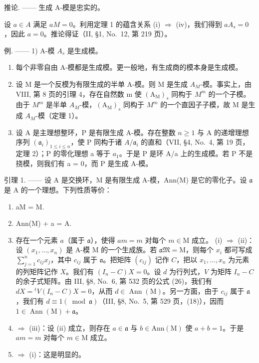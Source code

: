 推论. —— 生成 A-模是忠实的。

设 \(a \in A\) 满足 \(aM = 0\)。利用定理 1 的蕴含关系 (i) \(\Rightarrow\) (iv)，我们得到 \(aA_s = 0\)，因此 \(a = 0\)。推论得证（II, §1, No.~12, 第 219 页）。

例. —— 1) A-模 \(A_s\) 是生成模。

\begin{enumerate}
\def\labelenumi{\arabic{enumi})}
\setcounter{enumi}{1}
\item
  每个非零自由 A-模都是生成模。更一般地，有生成商的模本身是生成模。
\item
  设 M 是一个反模为有限生成的半单 A-模。则 M 是生成 \(A_{M}\)-模。事实上，由 VIII, 第 8 页的引理 4，存在自然数 m 使 \((\mathrm{A}_{\mathrm{M}})_{s}\) 同构于 \(M^{m}\) 的一个子模。由于 \(M^{m}\) 是半单 \(A_{M}\)-模，\((\mathrm{A}_{\mathrm{M}})_{s}\) 同构于 \(M^{m}\) 的一个直因子子模，故 M 是生成 \(A_{M}\)-模（定理 1）。
\item
  设 A 是主理想整环，P 是有限生成 A-模。存在整数 \(n \geqslant 1\) 与 A 的递增理想序列 \((\mathfrak{a}_{i})_{1 \leqslant i \leqslant n}\)，使 P 同构于诸 \(A/\mathfrak{a}_{i}\) 的直和（VII, §4, No.~4, 第 19 页，定理 2）；P 的零化理想 a 等于 \(a_{1}\)。于是 P 是环 A/a 上的生成模。若 P 不是挠模，则我们有 a = 0，而 P 是生成 A-模。
\end{enumerate}

引理 1. —— 设 A 是交换环，M 是有限生成 A-模，Ann(M) 是它的零化子。设 \(\mathfrak{a}\) 是 A 的一个理想。下列性质等价：

\begin{enumerate}
\def\labelenumi{(\roman{enumi})}
\item
  aM = M.
\item
  Ann(M) + a = A.
\item
  存在一个元素 \(a\)（属于 \(\mathfrak{a}\)），使得 \(am = m\) 对每个 \(m \in \mathrm{M}\) 成立。 (i) \(\Rightarrow\) (ii)：设 \((x_1, \ldots, x_n)\) 是 A-模 M 的一个生成族。若 \(\mathfrak{aM} = \mathrm{M}\)，则每个 \(x_i\) 都可写成 \(\sum_{j=1}^{n} c_{ij} x_j\)，其中 \(c_{ij}\) 属于 \(\mathfrak{a}\)。把矩阵 \((c_{ij})\) 记作 \(C\)，把以 \(x_1, \ldots, x_n\) 为元素的列矩阵记作 \(X\)。我们有 \((I_n - C)X = 0\)。设 \(d\) 为行列式，\(V\) 为矩阵 \(I_n - C\) 的余子式矩阵。由 III, §8, No.~6, 第 532 页的公式 (26)，我们有 \(dX = {}^t V(I_n - C)X = 0\)，从而 \(d \in \operatorname{Ann}(\mathrm{M})\)。另一方面，由于 \(c_{ij}\) 属于 \(\mathfrak{a}\)，我们有 \(d \equiv 1 (\bmod \mathfrak{a})\)（III, §8, No.~5, 第 529 页，(18)），因而 \(1 \in \operatorname{Ann}(\mathrm{M}) + \mathfrak{a}\)。
\item
  \(\Rightarrow\) (iii)：设 (ii) 成立，则存在 \(a\in \mathfrak{a}\) 与 \(b\in \mathrm{Ann}(\mathrm{M})\) 使 \(a + b = 1\)。于是 \(am = m\) 对每个 \(m\in \mathrm{M}\) 成立。
\item
  \(\Rightarrow\) (i)：这是明显的。
\end{enumerate}

